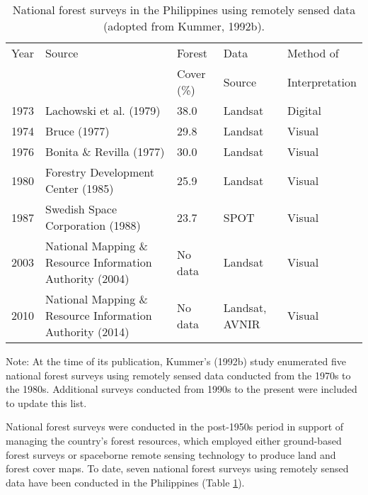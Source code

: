 \begin{spacing}{1.0}
\begin{longtable}[h!]{ p{1cm} p{5.4cm} p{2.2cm} p{1.9cm} p{2.5cm} }

    \caption[National forest surveys in the Philippines using remotely sensed data.]{National forest surveys in the Philippines using remotely sensed data (adopted from Kummer, 1992b).}
    \label{tab: intro-table1.1}\\
    
    	\toprule
    	Year & Source & Forest & Data & Method of\\ 
		{} & {} & Cover (\%) & Source & Interpretation\\ 
    	\midrule
    	\endhead
    	
		1973 & Lachowski et al. (1979) & 38.0 & Landsat & Digital\\
		1974 & Bruce (1977) & 29.8 & Landsat & Visual\\ 
		1976 & Bonita \& Revilla (1977) & 30.0 & Landsat & Visual\\ 
		1980 & Forestry Development Center (1985) & 25.9 & Landsat & Visual\\
		1987 & Swedish Space Corporation (1988) & 23.7 & SPOT & Visual\\
		2003 & National Mapping \& Resource Information Authority (2004) & No data & Landsat & Visual\\
		2010 & National Mapping \& Resource Information Authority (2014) & No data & Landsat, AVNIR & Visual\\ 
				
    	\bottomrule
    
\end{longtable}

	\noindent Note: At the time of its publication, Kummer's (1992b) study enumerated five national forest surveys using remotely sensed data conducted from the 1970s to the 1980s. Additional surveys conducted from 1990s to the present were included to update this list.\\ \newline
	
\end{spacing}

National forest surveys were conducted in the post-1950s period in support of managing the country's forest resources, which employed either ground-based forest surveys or spaceborne remote sensing technology to produce land and forest cover maps. To date, seven national forest surveys using remotely sensed data have been conducted in the Philippines (Table \ref{tab: intro-table1.1}).

